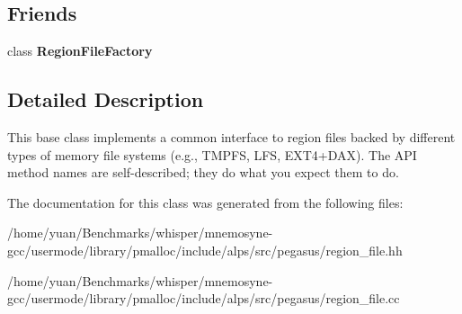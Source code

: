 \subsection*{Friends}
\begin{DoxyCompactItemize}
\item 
class {\bfseries Region\+File\+Factory}\hypertarget{classalps_1_1RegionFile_a76c88d2d08e2b3f7c7245690dfa65d84}{}\label{classalps_1_1RegionFile_a76c88d2d08e2b3f7c7245690dfa65d84}

\end{DoxyCompactItemize}


\subsection{Detailed Description}
This base class implements a common interface to region files backed by different types of memory file systems (e.\+g., T\+M\+P\+FS, L\+FS, E\+X\+T4+\+D\+AX). The A\+PI method names are self-\/described; they do what you expect them to do. 

The documentation for this class was generated from the following files\+:\begin{DoxyCompactItemize}
\item 
/home/yuan/\+Benchmarks/whisper/mnemosyne-\/gcc/usermode/library/pmalloc/include/alps/src/pegasus/region\+\_\+file.\+hh\item 
/home/yuan/\+Benchmarks/whisper/mnemosyne-\/gcc/usermode/library/pmalloc/include/alps/src/pegasus/region\+\_\+file.\+cc\end{DoxyCompactItemize}
